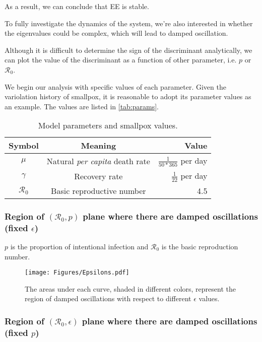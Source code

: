 \documentclass[12pt]{article}
\newcommand{\R}{\mathcal{R}}
\begin{document}
As a result, we can conclude that EE is stable.

To fully investigate the dynamics of the system, we're also interested in whether the eigenvalues could be complex, which will lead to damped oscillation. 

Although it is difficult to determine the sign of the discriminant analytically, we can plot the value of the discriminant as a function of other parameter, i.e. $p$ or $\R_0$.

We begin our analysis with specific values of each parameter. Given the variolation history of smallpox, it is reasonable to adopt its parameter values as an example. The values are listed in \autoref{tab:params}.

\begin{table}[H]
\begin{center}
\caption{Model parameters and smallpox values.}
\label{tab:params}
\smallskip
\begin{tabular}{c|c|r}
{\bfseries Symbol} & {\bfseries Meaning} & {\bfseries Value} \\\hline
$\mu$ & Natural \emph{per capita} death rate & $\frac{1}{50*365}$ per day \\
$\gamma$ & Recovery rate & $\frac{1}{22}$ per day \\
$\R_0$ & Basic reproductive number & 4.5
\end{tabular}
\end{center}
\end{table}

\subsubsection{Region of $(\R_0,p)$ plane where there are damped
  oscillations (fixed $\epsilon$)}

$p$ is the proportion of intentional infection and $\R_0$ is the basic reproduction number.

\begin{figure}[h]
  \centering
  \texttt{[image: Figures/Epsilons.pdf]}
  \caption{The areas under each curve, shaded in different colors, represent the region of damped oscillations with respect to different $\epsilon$ values.}
\end{figure}

\subsubsection{Region of $(\R_0,\epsilon)$ plane where there are damped
  oscillations (fixed $p$)}
\end{document}
